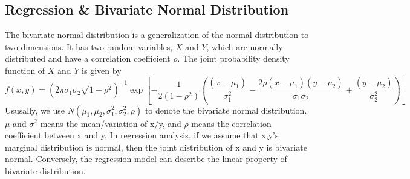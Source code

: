 \documentclass[main]{subfiles}
\begin{document}

\subsection{Regression \& Bivariate Normal Distribution}
The bivariate normal distribution is a generalization of the normal distribution to two dimensions. It has two random variables, $X$ and $Y$, which are normally distributed and have a correlation coefficient $\rho$. The joint probability density function of $X$ and $Y$ is given by
$$ f(x,y)=(2\pi \sigma_1\sigma_2\sqrt{1-\rho^2})^{-1}\exp [-\frac{1}{2(1-\rho^2)}\left(\frac{(x-\mu_1)}{\sigma_1^2}-\frac{2\rho(x-\mu_1)(y-\mu_2)}{\sigma_1\sigma_2}+\frac{(y-\mu_2)}{\sigma_2^2}\right)] $$
Ususally, we use $N(\mu_1,\mu_2,\sigma_1^2,\sigma_2^2,\rho)$ to denote the bivariate normal distribution. $\mu$ and $\sigma^2$ means the mean/variation of x/y, and $\rho$ means the correlation coefficient between x and y. In regression analysis, if we assume that x,y's marginal distribution is normal, then the joint distribution of x and y is bivariate normal. Conversely, the regression model can describe the linear property of bivariate distribution. \par
\end{document}
